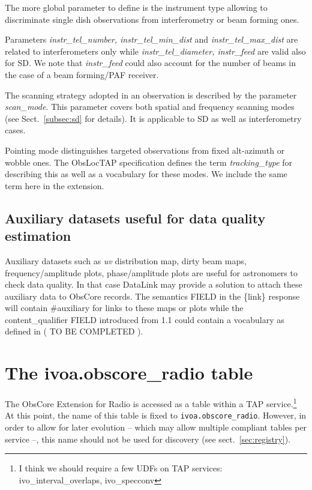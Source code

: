 \documentclass[11pt,a4paper]{ivoa}
\begin{document}
The more global parameter to define is the instrument type allowing to discriminate single dish observations from interferometry or beam forming ones.

Parameters \emph{instr\_tel\_number, instr\_tel\_min\_dist} and  \emph{instr\_tel\_max\_dist} are related to interferometers only while 
\emph{instr\_tel\_diameter, instr\_feed } are valid also for SD.
We note that \emph{instr\_feed} could also  account for the number of beams in the case of a beam forming/PAF receiver.

The scanning strategy adopted in an observation is described by the parameter \emph{scan\_mode}. This parameter covers both spatial
and frequency scanning modes (see Sect.~\ref{subsec:sd} for details).
It is applicable to  SD as well as  interferometry cases.

Pointing mode distinguishes targeted observations from  fixed alt-azimuth or wobble ones. The ObsLocTAP specification \citep{2021ivoa.spec.0724S} defines the term \emph{tracking\_type} for describing this as well as a  vocabulary for these modes. 
We include the same term here in the extension.

\subsection{Auxiliary datasets useful for data quality estimation}

Auxiliary datasets such as  \emph{uv} distribution map, dirty beam maps, frequency/amplitude plots, phase/amplitude plots are useful for astronomers to check data quality.
In that case DataLink \citep{2015ivoa.spec.0617D} may provide a solution to attach these auxiliary data to ObsCore records. The semantics FIELD in the \{link\}
response  will contain \#auxiliary  for links to these maps or plots while  the content\_qualifier FIELD introduced from 1.1  could contain a vocabulary as defined in ( TO BE COMPLETED ).


\section{The ivoa.obscore\_radio table}
\label{sec:implementation}
The ObsCore Extension for Radio is accessed as a table within a TAP
\citep{2019ivoa.spec.0927D} service.\footnote{I think we should require a
few UDFs on TAP services: ivo\_interval\_overlaps, ivo\_specconv}  At this
point, the name of this table is fixed to \verb|ivoa.obscore_radio|.
However, in order to allow for later evolution -- which may allow
multiple compliant tables per service --, this name should not be used
for discovery (see sect.~\ref{sec:registry}).
\end{document}
